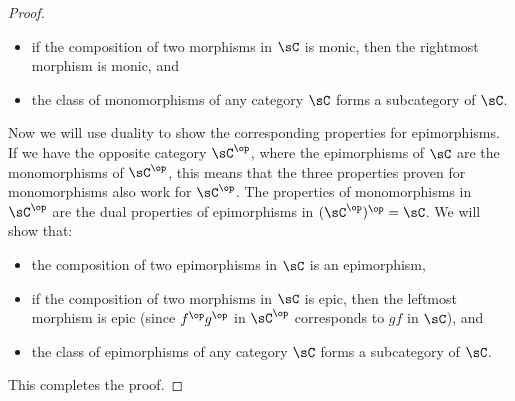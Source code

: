 \documentclass[../../main]{subfiles}
\begin{document}
\begin{proof}
\begin{itemize}
		\item if the composition of two morphisms in \(\sC\) is monic, then the
			rightmost morphism is monic, and

		\item the class of monomorphisms of any category \(\sC\) forms a
			subcategory of \(\sC\).
	\end{itemize}

	Now we will use duality to show the corresponding properties for
	epimorphisms. If we have the opposite category \(\sC^{\op}\), where the
	epimorphisms of \(\sC\) are the monomorphisms of \(\sC^{\op}\), this means
	that the three properties proven for monomorphisms also work for
	\(\sC^{\op}\). The properties of monomorphisms in \(\sC^{\op}\) are the dual
	properties of epimorphisms in \((\sC^{\op})^{\op} = \sC\). We will show that:
	\begin{itemize}
		\item the composition of two epimorphisms in \(\sC\) is an epimorphism,

		\item if the composition of two morphisms in \(\sC\) is epic, then the
			leftmost morphism is epic (since \(f^\op g^\op\) in \(\sC^\op\)
			corresponds to \(gf\) in \(\sC\)), and

		\item the class of epimorphisms of any category \(\sC\) forms a
			subcategory of \(\sC\).
	\end{itemize}
	This completes the proof.
\end{proof}
\end{document}
